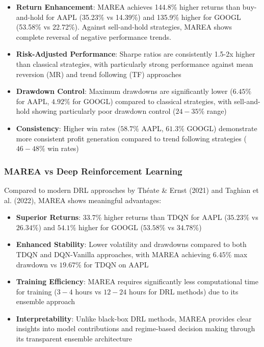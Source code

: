 \documentclass[10pt,twocolumn]{article}
\begin{document}
\begin{itemize}[itemsep=1pt]
\item \textbf{Return Enhancement}: MAREA achieves 144.8\% higher returns than buy-and-hold for AAPL (35.23\% vs 14.39\%) and 135.9\% higher for GOOGL (53.58\% vs 22.72\%). Against sell-and-hold strategies, MAREA shows complete reversal of negative performance trends.
\item \textbf{Risk-Adjusted Performance}: Sharpe ratios are consistently 1.5-2x higher than classical strategies, with particularly strong performance against mean reversion (MR) and trend following (TF) approaches
\item \textbf{Drawdown Control}: Maximum drawdowns are significantly lower ($6.45\%$ for AAPL, $4.92\%$ for GOOGL) compared to classical strategies, with sell-and-hold showing particularly poor drawdown control ($24{-}35\%$ range)
\item \textbf{Consistency}: Higher win rates ($58.7\%$ AAPL, $61.3\%$ GOOGL) demonstrate more consistent profit generation compared to trend following strategies ($46{-}48\%$ win rates)
\end{itemize}

\subsubsection{MAREA vs Deep Reinforcement Learning}

Compared to modern DRL approaches by Théate \& Ernst (2021) and Taghian et al. (2022), MAREA shows meaningful advantages:

\begin{itemize}[itemsep=1pt]
\item \textbf{Superior Returns}: $33.7\%$ higher returns than TDQN for AAPL ($35.23\%$ vs $26.34\%$) and $54.1\%$ higher for GOOGL ($53.58\%$ vs $34.78\%$)
\item \textbf{Enhanced Stability}: Lower volatility and drawdowns compared to both TDQN and DQN-Vanilla approaches, with MAREA achieving $6.45\%$ max drawdown vs $19.67\%$ for TDQN on AAPL
\item \textbf{Training Efficiency}: MAREA requires significantly less computational time for training ($3{-}4$ hours vs $12{-}24$ hours for DRL methods) due to its ensemble approach
\item \textbf{Interpretability}: Unlike black-box DRL methods, MAREA provides clear insights into model contributions and regime-based decision making through its transparent ensemble architecture
\end{itemize}
\end{document}
